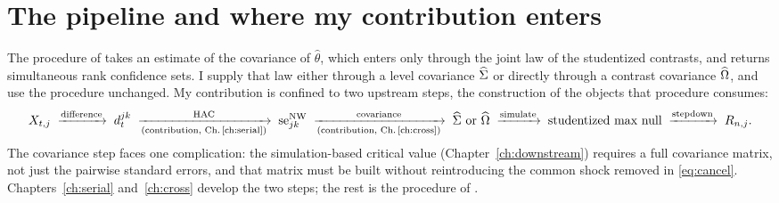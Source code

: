 \section{The pipeline and where my contribution enters}
\label{sec:pipeline}

The procedure of \citet{mogstad2024} takes an estimate of the covariance of
$\hat\theta$, which enters only through the joint law of the studentized contrasts, and
returns simultaneous rank confidence sets. I supply that law either through a level
covariance $\widehat{\Sigma}$ or directly through a contrast covariance $\widehat{\Omega}$, and use the
procedure unchanged. My contribution is confined to two upstream steps, the construction
of the objects that procedure consumes:
\begin{equation*}
  X_{t,j}\;\xrightarrow{\text{difference}}\;d^{jk}_t
  \;\xrightarrow[\text{(contribution, Ch.\,\ref{ch:serial})}]{\text{HAC}}\;\mathrm{se}^{\mathrm{NW}}_{jk}
  \;\xrightarrow[\text{(contribution, Ch.\,\ref{ch:cross})}]{\text{covariance}}\;\widehat{\Sigma} \text{ or } \widehat{\Omega}
  \;\xrightarrow{\text{simulate}}\;\text{studentized max null}
  \;\xrightarrow{\text{stepdown}}\;R_{n,j}.
\end{equation*}
The covariance step faces one complication: the simulation-based critical value
(Chapter~\ref{ch:downstream}) requires a full covariance matrix, not just the pairwise
standard errors, and that matrix must be built without reintroducing the common shock
removed in \eqref{eq:cancel}. Chapters~\ref{ch:serial} and~\ref{ch:cross} develop the
two steps; the rest is the procedure of \citet{mogstad2024}.
